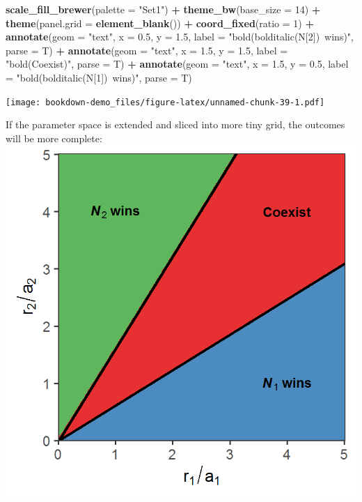 \documentclass[
]{book}
\newenvironment{Shaded}{\begin{snugshade}}{\end{snugshade}}
\newcommand{\DataTypeTok}[1]{\textcolor[rgb]{0.13,0.29,0.53}{#1}}
\newcommand{\DecValTok}[1]{\textcolor[rgb]{0.00,0.00,0.81}{#1}}
\newcommand{\FloatTok}[1]{\textcolor[rgb]{0.00,0.00,0.81}{#1}}
\newcommand{\KeywordTok}[1]{\textcolor[rgb]{0.13,0.29,0.53}{\textbf{#1}}}
\newcommand{\NormalTok}[1]{#1}
\newcommand{\OperatorTok}[1]{\textcolor[rgb]{0.81,0.36,0.00}{\textbf{#1}}}
\newcommand{\StringTok}[1]{\textcolor[rgb]{0.31,0.60,0.02}{#1}}
\begin{document}
\begin{Shaded}
\begin{Highlighting}[]
\StringTok{  }\KeywordTok{scale_fill_brewer}\NormalTok{(}\DataTypeTok{palette =} \StringTok{"Set1"}\NormalTok{) }\OperatorTok{+}
\StringTok{  }\KeywordTok{theme_bw}\NormalTok{(}\DataTypeTok{base_size =} \DecValTok{14}\NormalTok{) }\OperatorTok{+}
\StringTok{  }\KeywordTok{theme}\NormalTok{(}\DataTypeTok{panel.grid =} \KeywordTok{element_blank}\NormalTok{()) }\OperatorTok{+}
\StringTok{  }\KeywordTok{coord_fixed}\NormalTok{(}\DataTypeTok{ratio =} \DecValTok{1}\NormalTok{) }\OperatorTok{+}
\StringTok{  }\KeywordTok{annotate}\NormalTok{(}\DataTypeTok{geom =} \StringTok{"text"}\NormalTok{, }\DataTypeTok{x =} \FloatTok{0.5}\NormalTok{, }\DataTypeTok{y =} \FloatTok{1.5}\NormalTok{, }\DataTypeTok{label =} \StringTok{"bold(bolditalic(N[2])~wins)"}\NormalTok{, }\DataTypeTok{parse =}\NormalTok{ T) }\OperatorTok{+}
\StringTok{  }\KeywordTok{annotate}\NormalTok{(}\DataTypeTok{geom =} \StringTok{"text"}\NormalTok{, }\DataTypeTok{x =} \FloatTok{1.5}\NormalTok{, }\DataTypeTok{y =} \FloatTok{1.5}\NormalTok{, }\DataTypeTok{label =} \StringTok{"bold(Coexist)"}\NormalTok{, }\DataTypeTok{parse =}\NormalTok{ T) }\OperatorTok{+}
\StringTok{  }\KeywordTok{annotate}\NormalTok{(}\DataTypeTok{geom =} \StringTok{"text"}\NormalTok{, }\DataTypeTok{x =} \FloatTok{1.5}\NormalTok{, }\DataTypeTok{y =} \FloatTok{0.5}\NormalTok{, }\DataTypeTok{label =} \StringTok{"bold(bolditalic(N[1])~wins)"}\NormalTok{, }\DataTypeTok{parse =}\NormalTok{ T)}
\end{Highlighting}
\end{Shaded}

\texttt{[image: bookdown-demo\_files/figure-latex/unnamed-chunk-39-1.pdf]}

If the parameter space is extended and sliced into more tiny grid, the outcomes will be more complete:
\includegraphics{assignment_figures/W13.png}
\end{document}
